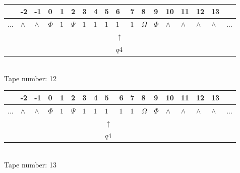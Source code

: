 \documentclass[11pt]{article}
\begin{document}
\begin{table}[H]
\centering
\begin{tabular}{llllllllllllllllll}
 & -2 & -1 & 0 & 1 & 2 & 3 & 4 & 5 & 6 & 7 & 8 & 9 & 10 & 11 & 12 & 13 & \\
\hline
$...$ & \multicolumn{1}{|l|}{$\wedge$} & \multicolumn{1}{|l|}{$\wedge$} & \multicolumn{1}{|l|}{$\Phi$} & \multicolumn{1}{|l|}{$1$} & \multicolumn{1}{|l|}{$\Psi$} & \multicolumn{1}{|l|}{$1$} & \multicolumn{1}{|l|}{$1$} & \multicolumn{1}{|l|}{$1$} & \multicolumn{1}{|l|}{$1$} & \multicolumn{1}{|l|}{$1$} & \multicolumn{1}{|l|}{$\Omega$} & \multicolumn{1}{|l|}{$\Phi$} & \multicolumn{1}{|l|}{$\wedge$} & \multicolumn{1}{|l|}{$\wedge$} & \multicolumn{1}{|l|}{$\wedge$} & \multicolumn{1}{|l|}{$\wedge$} & $...$\\
\hline
&  &  &  &  &  &  &  &  & $\uparrow$ &  &  &  &  &  &  &  &  \\
&  &  &  &  &  &  &  &  & $ q4 $ &  &  &  &  &  &  &  &  \\
\end{tabular}
\\
Tape number: 12
\noindent\makebox[\linewidth]{\hdashrule{\textwidth}{1pt}{1pt}}\end{table}

\begin{table}[H]
\centering
\begin{tabular}{llllllllllllllllll}
 & -2 & -1 & 0 & 1 & 2 & 3 & 4 & 5 & 6 & 7 & 8 & 9 & 10 & 11 & 12 & 13 & \\
\hline
$...$ & \multicolumn{1}{|l|}{$\wedge$} & \multicolumn{1}{|l|}{$\wedge$} & \multicolumn{1}{|l|}{$\Phi$} & \multicolumn{1}{|l|}{$1$} & \multicolumn{1}{|l|}{$\Psi$} & \multicolumn{1}{|l|}{$1$} & \multicolumn{1}{|l|}{$1$} & \multicolumn{1}{|l|}{$1$} & \multicolumn{1}{|l|}{$1$} & \multicolumn{1}{|l|}{$1$} & \multicolumn{1}{|l|}{$\Omega$} & \multicolumn{1}{|l|}{$\Phi$} & \multicolumn{1}{|l|}{$\wedge$} & \multicolumn{1}{|l|}{$\wedge$} & \multicolumn{1}{|l|}{$\wedge$} & \multicolumn{1}{|l|}{$\wedge$} & $...$\\
\hline
&  &  &  &  &  &  &  & $\uparrow$ &  &  &  &  &  &  &  &  &  \\
&  &  &  &  &  &  &  & $ q4 $ &  &  &  &  &  &  &  &  &  \\
\end{tabular}
\\
Tape number: 13
\noindent\makebox[\linewidth]{\hdashrule{\textwidth}{1pt}{1pt}}\end{table}
\end{document}
